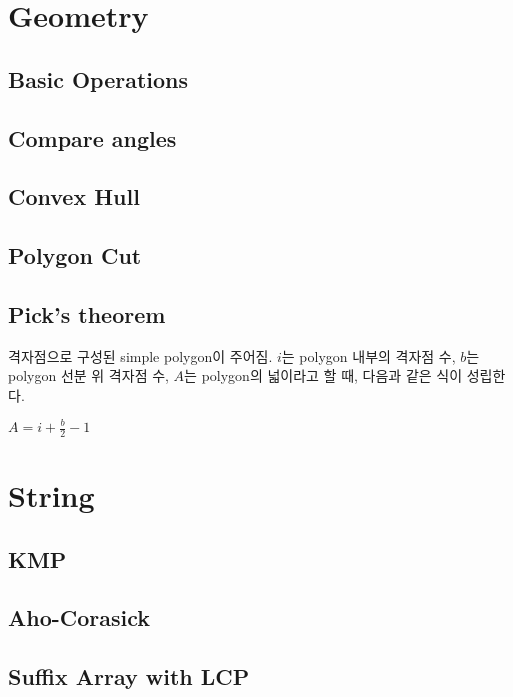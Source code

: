 \documentclass[10pt,landscape,a4paper,twocolumn]{article}
\begin{document}
\section{Geometry}

\subsection{Basic Operations}


\subsection{Compare angles}

\subsection{Convex Hull}


\subsection{Polygon Cut}


\subsection{Pick's theorem}

격자점으로 구성된 simple polygon이 주어짐. $i$는 polygon 내부의 격자점 수, $b$는 polygon 선분 위 격자점 수, $A$는 polygon의 넓이라고 할 때, 다음과 같은 식이 성립한다.

$A = i + \frac{b}{2} - 1$

\section{String}

\subsection{KMP}


\subsection{Aho-Corasick}


\subsection{Suffix Array with LCP}

\end{document}

